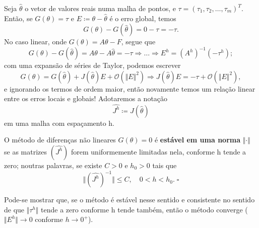 \documentclass[../differential_methods.tex]{subfiles}
\begin{document}
Seja \(\hat{\theta }\) o vetor de valores reais numa malha de pontos, e \(\tau=(\tau_1, \tau_2, \dotsc , \tau_{m})^{T}\). Então, se \(G(\theta )=\tau \) e \(E\coloneqq \theta -\hat{\theta }\) é o erro global, temos
\[
	G(\theta )-G(\hat{\theta })=0-\tau = -\tau.
\]
No caso linear, onde \(G(\theta )=A\theta - F\), segue que
\[
	G(\theta )-G(\hat{\theta })=A\theta - A\hat{\theta } = -\tau \Rightarrow \dotsc \Rightarrow E^{h} = (A^{h})^{-1}(-\tau^{h});
\]
com uma expansão de séries de Taylor, podemos escrever
\[
	G(\theta )=G(\hat{\theta })+J(\hat{\theta })E + \mathcal{O}(\Vert E \Vert^{2}) \Rightarrow J(\hat{\theta })E = -\tau + \mathcal{O}(\Vert E \Vert^{2}),
\]
e ignorando os termos de ordem maior, então novamente temos um relação linear entre os erros locais e globais! Adotaremos a notação
\[
	\hat{J^{h}}\coloneqq J(\hat{\theta })
\]
em uma malha com espaçamento h.

\begin{def*}
	O método de diferenças não lineares \(G(\theta )=0\) é \textbf{estável em uma norma} \(\Vert \cdot  \Vert\) se as matrizes \((\hat{J^{h}})\) forem uniformemente limitadas nela, conforme h tende a zero; noutras palavras, se existe \(C>0\) e \(h_{0}>0\) tais que
	\[
		\biggl\Vert (\hat{J^{h}})^{-1} \biggr\Vert \leq C, \quad 0<h<h_{0}. \; \square
	\]
\end{def*}
Pode-se mostrar que, se o método é estável nesse sentido e consistente no sentido de que \(\Vert \tau^{h} \Vert\) tende a zero conforme h tende também, então o método converge (\(\Vert E^{h} \Vert\to 0\) conforme \(h\to0^{+}\)).
\end{document}
